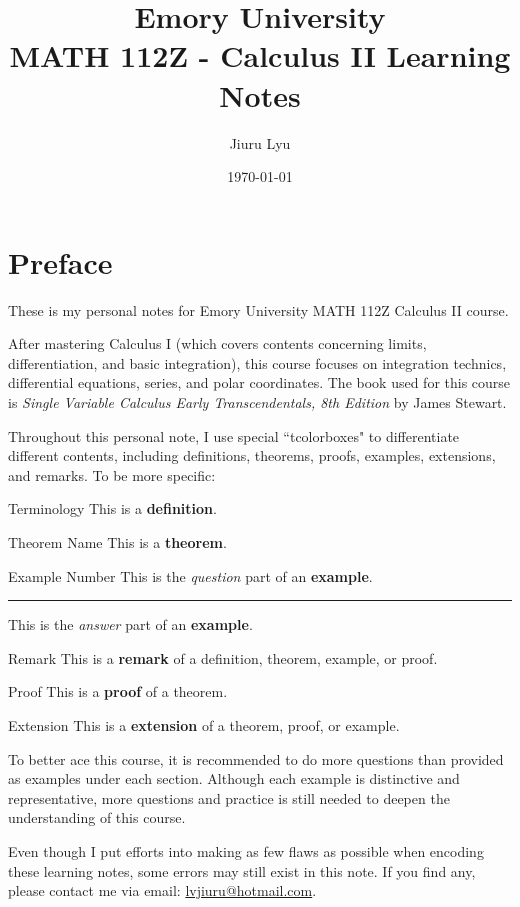 \documentclass[12pt,a4paper]{article}
\title{Emory University\\\textbf{MATH 112Z - Calculus II Learning Notes}}
\author{Jiuru Lyu}
\date{\today}
\begin{document}
\maketitle
\tableofcontents
\newpage

\section{Preface}
These is my personal notes for Emory University MATH 112Z Calculus II course. 

After mastering Calculus I (which covers contents concerning limits, differentiation, and basic integration), this course focuses on integration technics, differential equations, series, and polar coordinates. The book used for this course is \textit{Single Variable Calculus Early Transcendentals, 8th Edition} by James Stewart. 

Throughout this personal note, I use special ``tcolorboxes" to differentiate different contents, including definitions, theorems, proofs, examples, extensions, and remarks. To be more specific: 
\begin{df}{Terminology}
	This is a \textbf{definition}.	
\end{df}
\begin{thm}{Theorem Name}
	This is a \textbf{theorem}.	
\end{thm}
\begin{eg}{Example Number}
	This is the \textit{question} part of an \textbf{example}. \\
	\noindent\rule[0.25\baselineskip]{\textwidth}{1pt}
	This is the \textit{answer} part of an \textbf{example}. 
\end{eg}
\begin{rmk}{Remark}
	This is a \textbf{remark} of a definition, theorem, example, or proof. 
\end{rmk}
\begin{prf}{Proof}
	This is a \textbf{proof} of a theorem. 
\end{prf}
\begin{ext}{Extension}
	This is a \textbf{extension} of a theorem, proof, or example. 	
\end{ext}

To better ace this course, it is recommended to do more questions than provided as examples under each section. Although each example is distinctive and representative, more questions and practice is still needed to deepen the understanding of this course. 

Even though I put efforts into making as few flaws as possible when encoding these learning notes, some errors may still exist in this note. If you find any, please contact me via email: \url{lvjiuru@hotmail.com}. 
\end{document}
